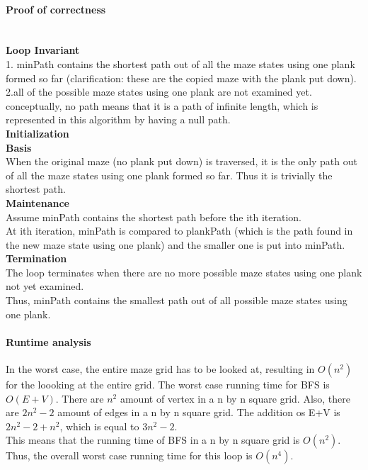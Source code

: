 \documentclass{article}
\begin{document}
\paragraph{Proof of correctness} \hspace{0pt}\\
\textbf{Loop Invariant}\\
1. minPath contains the shortest path out of all the maze states using one plank formed so far (clarification: these are the copied maze with the plank put down).\\
2.all of the possible maze states using one plank are not examined yet.\\
conceptually, no path means that it is a path of infinite length, which is represented in this algorithm by having a null path.\\
\textbf{Initialization}\\
\textbf{Basis}\\
When the original maze (no plank put down) is traversed, it is the only path out of all the maze states using one plank formed so far. Thus it is trivially the shortest path.\\
\textbf{Maintenance}\\
Assume minPath contains the shortest path before the ith iteration.\\
At ith iteration, minPath is compared to plankPath (which is the path found in the new maze state using one plank) and the smaller one is put into minPath.\\
\textbf{Termination}\\
The loop terminates when there are no more possible maze states using one plank not yet examined.\\
Thus, minPath contains the smallest path out of all possible maze states using one plank.\\

\paragraph{Runtime analysis}
In the worst case, the entire maze grid has to be looked at, resulting in $O(n^2)$ for the loooking at the entire grid. 
The worst case running time for BFS is $O(E+V)$. There are $n^2$ amount of vertex in a n by n square grid. Also, there are $2n^2 -2$ amount of edges in a n by n square grid. The addition os E+V is $2n^2-2+n^2$, which is equal to $3n^2-2$.\\
This means that the running time of BFS in a n by n square grid is $O(n^2)$.\\
Thus, the overall worst case running time for this loop is $O(n^4)$.
\end{document}
